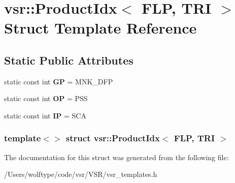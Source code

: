\hypertarget{structvsr_1_1_product_idx_3_01_f_l_p_00_01_t_r_i_01_4}{\section{vsr\-:\-:Product\-Idx$<$ F\-L\-P, T\-R\-I $>$ Struct Template Reference}
\label{structvsr_1_1_product_idx_3_01_f_l_p_00_01_t_r_i_01_4}
}
\subsection*{Static Public Attributes}
\begin{DoxyCompactItemize}
\item 
\hypertarget{structvsr_1_1_product_idx_3_01_f_l_p_00_01_t_r_i_01_4_ad902682b26839c556935ac3f31587bd5}{static const int {\bfseries G\-P} = M\-N\-K\-\_\-\-D\-F\-P}\label{structvsr_1_1_product_idx_3_01_f_l_p_00_01_t_r_i_01_4_ad902682b26839c556935ac3f31587bd5}

\item 
\hypertarget{structvsr_1_1_product_idx_3_01_f_l_p_00_01_t_r_i_01_4_aa2958bc4bb76b1f6171f1ed5a72bfb1d}{static const int {\bfseries O\-P} = P\-S\-S}\label{structvsr_1_1_product_idx_3_01_f_l_p_00_01_t_r_i_01_4_aa2958bc4bb76b1f6171f1ed5a72bfb1d}

\item 
\hypertarget{structvsr_1_1_product_idx_3_01_f_l_p_00_01_t_r_i_01_4_a72081d15cd6cf55c50353acefc65b361}{static const int {\bfseries I\-P} = S\-C\-A}\label{structvsr_1_1_product_idx_3_01_f_l_p_00_01_t_r_i_01_4_a72081d15cd6cf55c50353acefc65b361}

\end{DoxyCompactItemize}
\subsubsection*{template$<$$>$ struct vsr\-::\-Product\-Idx$<$ F\-L\-P, T\-R\-I $>$}



The documentation for this struct was generated from the following file\-:\begin{DoxyCompactItemize}
\item 
/\-Users/wolftype/code/vsr/\-V\-S\-R/vsr\-\_\-templates.\-h\end{DoxyCompactItemize}
